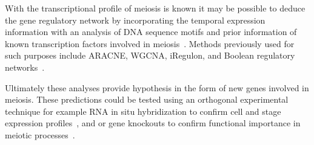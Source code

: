 
With the transcriptional profile of meiosis is known it may be possible to deduce the gene regulatory network by incorporating the temporal expression information with an analysis of DNA sequence motifs and prior information of known transcription factors involved in meiosis~\cite{Padovan-Merhar2013Using, Goutsias2007Computational}. Methods previously used for such purposes include ARACNE, WGCNA, iRegulon, and Boolean regulatory networks~\cite{Margolin2006Reverse, Zhang2005General, Janky2014iRegulon, Moignard2013Characterization}.

Ultimately these analyses provide hypothesis in the form of new genes involved in meiosis. These predictions could be tested using an orthogonal experimental technique for example RNA in situ hybridization to confirm cell and stage expression profiles~\cite{Moffitt2016Highperformance,Choi2016Mapping}, and or gene knockouts to confirm functional importance in meiotic processes~\cite{Jamsai2010Mouse}.
